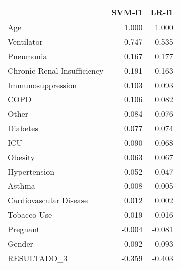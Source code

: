 \begin{tabular}{lrr}
\toprule
{} &  SVM-l1 &  LR-l1 \\
\midrule
Age                         &   1.000 &  1.000 \\
Ventilator                  &   0.747 &  0.535 \\
Pneumonia                   &   0.167 &  0.177 \\
Chronic Renal Insufficiency &   0.191 &  0.163 \\
Immunosuppression           &   0.103 &  0.093 \\
COPD                        &   0.106 &  0.082 \\
Other                       &   0.084 &  0.076 \\
Diabetes                    &   0.077 &  0.074 \\
ICU                         &   0.090 &  0.068 \\
Obesity                     &   0.063 &  0.067 \\
Hypertension                &   0.052 &  0.047 \\
Asthma                      &   0.008 &  0.005 \\
Cardiovascular Disease      &   0.012 &  0.002 \\
Tobacco Use                 &  -0.019 & -0.016 \\
Pregnant                    &  -0.004 & -0.081 \\
Gender                      &  -0.092 & -0.093 \\
RESULTADO\_3                 &  -0.359 & -0.403 \\
\bottomrule
\end{tabular}
